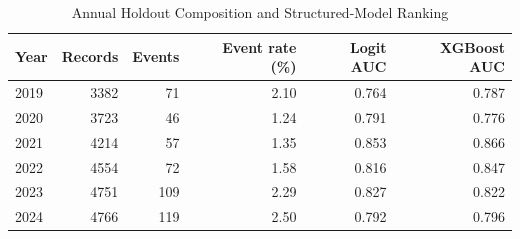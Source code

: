 \begin{table}[!htbp]\centering
\caption{Annual Holdout Composition and Structured-Model Ranking}\label{tab:a_annual}
\begin{tabular}{lrrrrr}\toprule
Year & Records & Events & Event rate (\%) & Logit AUC & XGBoost AUC \\
\midrule
2019 & 3382 & 71 & 2.10 & 0.764 & 0.787 \\
2020 & 3723 & 46 & 1.24 & 0.791 & 0.776 \\
2021 & 4214 & 57 & 1.35 & 0.853 & 0.866 \\
2022 & 4554 & 72 & 1.58 & 0.816 & 0.847 \\
2023 & 4751 & 109 & 2.29 & 0.827 & 0.822 \\
2024 & 4766 & 119 & 2.50 & 0.792 & 0.796 \\
\bottomrule\end{tabular}\end{table}
